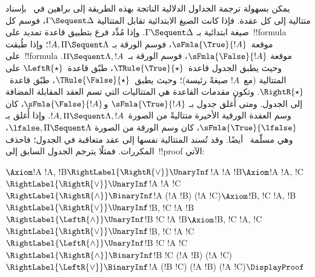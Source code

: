\documentclass[../../../include/open-logic-section]{subfiles}
\begin{document}
يمكن بسهولة ترجمة الجداول الدلالية الناتجة بهذه الطريقة إلى براهين في~
بإسناد متتالية إلى كل عقدة. فإذا كانت الصيغ الابتدائية تقابل المتتالية
$\Gamma\Sequent\Delta$، فوسم كل صيغة ابتدائية بـ
$\Gamma\Sequent\Delta$. وإذا مُدِّد فرع بتطبيق قاعدة تمديد على~!!{formula}
موقعة~$\sFmla{\True}{!A}$، فوسم الورقة بـ
$!A,\Pi\Sequent\Lambda$؛ وإذا طُبقت على~!!{formula} موقعة
$\sFmla{\False}{!A}$، فوسم الورقة بـ~$\Pi\Sequent\Lambda,!A$. وحيث يطبق
الجدول قاعدة~$\TRule{\True}{\star}$، طبّق قاعدة~$\LeftR{\star}$ على
المتتالية (مع~$!A$ صيغةً رئيسة)؛ وحيث يطبق~$\TRule{\False}{\star}$، طبّق
قاعدة~$\RightR{\star}$. وتكون مقدمات القاعدة هي المتتاليات التي تسم
العقد المقابلة المضافة إلى الجدول. ومتى أُغلق جدول بـ
$\sFmla{\True}{!A}$ و$\sFmla{\False}{!A}$، كان وسم العقدة الورقية الأخيرة
متتاليةً من الصورة~$!A,\Pi\Sequent\Lambda,!A$. وإذا أُغلق بـ
$\sFmla{\True}{\lfalse}$، كان وسم الورقة من الصورة
$\lfalse,\Pi\Sequent\Lambda$، وهي مسلّمة~ أيضًا. وقد تُسند
المتتالية نفسها إلى عقد متعاقبة في الجدول؛ فاحذف المكررات. فمثلًا يترجم
الجدول السابق إلى~!!{proof} الآتي:
\begin{maxwidth}
$
\Axiom$!A \fCenter !A, !B$
\RightLabel{\RightR{\lor}}
\UnaryInf$!A \fCenter !A \lor !B$
\Axiom$!A \fCenter !A, !C$
\RightLabel{\RightR{\lor}}
\UnaryInf$!A \fCenter !A \lor !C$
\RightLabel{\RightR{\land}}
\BinaryInf$!A \fCenter (!A \lor !B) \land (!A \lor !C)$
\Axiom$!B, !C \fCenter !A, !B$
\RightLabel{\RightR{\lor}}
\UnaryInf$!B, !C \fCenter !A \lor !B$
\RightLabel{\LeftR{\land}}
\UnaryInf$!B \land !C \fCenter !A \lor !B$
\Axiom$!B, !C \fCenter !A, !C$
\RightLabel{\RightR{\lor}}
\UnaryInf$!B, !C \fCenter !A \lor !C$
\RightLabel{\LeftR{\land}}
\UnaryInf$!B \land !C \fCenter !A \lor !C$
\RightLabel{\RightR{\land}}
\BinaryInf$!B \land !C \fCenter (!A \lor !B) \land
(!A \lor !C)$
\RightLabel{\LeftR{\lor}}
\BinaryInf$!A \lor (!B \land !C) \fCenter (!A \lor !B) \land
(!A \lor !C)$
\DisplayProof$
\end{maxwidth}
\end{document}

